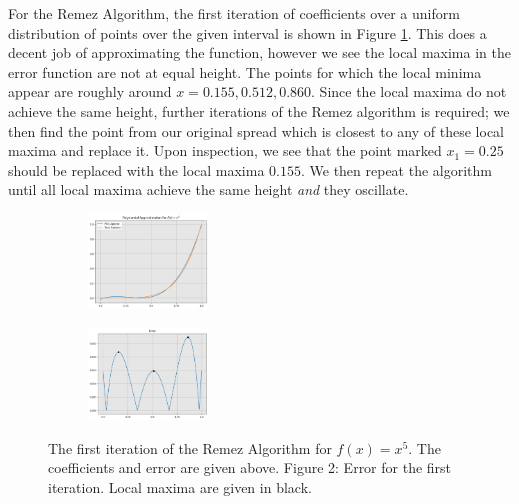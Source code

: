 \begin{solution}
      For the Remez Algorithm, the first iteration of coefficients over a uniform distribution of points over the given interval is shown in Figure \ref{fig:firstRemez15}. This does a decent job of approximating the function, however we see the local maxima in the error function are not at equal height. The points for which the local minima appear are roughly around $x = 0.155, 0.512, 0.860$. Since the local maxima do not achieve the same height, further iterations of the Remez algorithm is required; we then find the point from our original spread which is closest to any of these local maxima and replace it. Upon inspection, we see that the point marked $x_1 = 0.25$ should be replaced with the local maxima $0.155$. We then repeat the algorithm until all local maxima achieve the same height \textit{and} they oscillate. 
\end{solution}
\vspace{1in}
\begin{figure}[!hb]
    \centering
    \begin{subfigure}
    \centering
        \includegraphics[width=0.35\textwidth]{Figures/FirstRemez15.png}     
    \end{subfigure}%
    \hspace{10mm}
    \begin{subfigure}
        \centering
        \includegraphics[width=0.35\textwidth]{Figures/Error15.png}    
    \end{subfigure}
    \caption{The first iteration of the Remez Algorithm for $f(x) = x^5$. The coefficients and error are given above. Figure 2: Error for the first iteration. Local maxima are given in black.}
    \label{fig:firstRemez15}
\end{figure}



